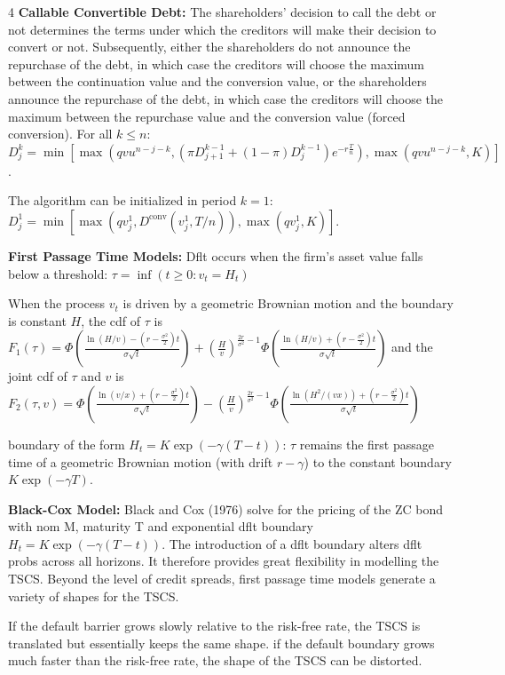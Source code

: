 \documentclass[landscape]{article}
\begin{document}
\begin{multicols}{4}
\textcolor{subsubsectioncolor}{\textbf{Callable Convertible Debt:}} The shareholders' decision to call the debt or not determines the terms under which the creditors 
will make their decision to convert or not. Subsequently, either the shareholders do not announce the repurchase of the debt, in 
which case the creditors will choose the maximum between the continuation value and the 
conversion value, or the shareholders announce the repurchase of the debt, in which case the 
creditors will choose the maximum between the repurchase value and the conversion value (forced conversion).
For all $k \leq n$: {\footnotesize $D_j^k = \min\left[ \max\left(qvu^{n-j-k}, (\pi D_{j+1}^{k-1} + (1-\pi)D_j^{k-1})e^{-r\frac{T}{n}}\right), \max(qvu^{n-j-k}, K)\right]$.}

The algorithm can be initialized in period $k = 1$: $D_j^1 = \min\left[\max\left(qv_j^1, D^{\text{conv}}(v_j^1, T/n)\right), \max(qv_j^1, K)\right]$.

\textcolor{subsectioncolor}{\textbf{First Passage Time Models:}} Dflt occurs when the firm's asset value falls below a threshold: $\tau = \inf(t \geq 0: v_t = H_t)$

When the process $v_t$ is driven by a geometric Brownian motion and the boundary is constant $H$, the cdf of $\tau$ is $F_1(\tau) = \Phi\left(\frac{\ln(H/v) - (r - \frac{\sigma^2}{2})t}{\sigma\sqrt{t}}\right) + \left(\frac{H}{v}\right)^{\frac{2r}{\sigma^2}-1}\Phi\left(\frac{\ln(H/v) + (r - \frac{\sigma^2}{2})t}{\sigma\sqrt{t}}\right)$ and the joint cdf of $\tau$ and $v$ is $F_2(\tau, v) = \Phi\left(\frac{\ln(v/x) + (r - \frac{\sigma^2}{2})t}{\sigma\sqrt{t}}\right) - \left(\frac{H}{v}\right)^{\frac{2r}{\sigma^2}-1}\Phi\left(\frac{\ln(H^2/(vx)) + (r - \frac{\sigma^2}{2})t}{\sigma\sqrt{t}}\right)$

boundary of the form $H_t = K\exp(-\gamma(T - t))$: $\tau$ remains the first passage time of a geometric Brownian motion (with drift $r - \gamma$) to the constant boundary $K\exp(-\gamma T)$.

\textcolor{subsubsectioncolor}{\textbf{Black-Cox Model:}} Black and Cox (1976) solve for the pricing of the ZC bond with nom M, maturity T 
and exponential dflt boundary $H_t = K\exp(-\gamma(T - t))$.
The introduction of a dflt boundary alters dflt probs across all horizons. It therefore 
provides great flexibility in modelling the TSCS. Beyond the level of credit spreads, first passage 
time models generate a variety of shapes for the TSCS.

If the default barrier grows slowly relative to the risk-free rate, the TSCS is translated 
but essentially keeps the same shape. if the default boundary grows much faster than the risk-free rate, the shape of the TSCS 
can be distorted.


\end{multicols}
\end{document}
